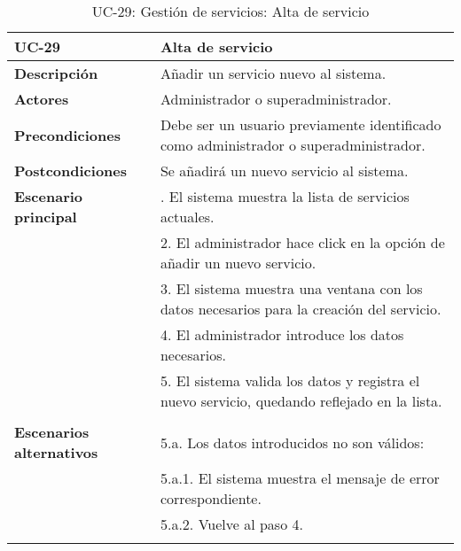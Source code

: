 \begin{table}[H]
  \begin{center}
    \begin{tabularx}{16.4cm}{|l|X|}
      \hline
      \textbf{UC-29} & \textbf{Alta de servicio}\\
      \hline
      \textbf{Descripción} & Añadir un servicio nuevo al sistema.\\
      \hline
      \textbf{Actores} & Administrador o superadministrador.\\
      \hline
      \textbf{Precondiciones} & Debe ser un usuario previamente identificado como administrador o superadministrador.\\
      \hline
      \textbf{Postcondiciones} & Se añadirá un nuevo servicio al sistema.\\
      \hline
      \textbf{Escenario principal} & \smallskip 1. El sistema muestra la lista de servicios actuales.\\
      & 2. El administrador hace click en la opción de añadir un nuevo servicio.\\
      & 3. El sistema muestra una ventana con los datos necesarios para la creación del servicio.\\
      & 4. El administrador introduce los datos necesarios.\\
      & 5. El sistema valida los datos y registra el nuevo servicio, quedando reflejado en la lista.\\
      & \\
      \hline
      \textbf{Escenarios alternativos} & \smallskip 5.a. Los datos introducidos no son válidos:\\
      & \hspace{0.3cm} 5.a.1. El sistema muestra el mensaje de error correspondiente.\\
      & \hspace{0.3cm} 5.a.2. Vuelve al paso 4.\\
      & \\
      \hline
    \end{tabularx}
    \caption{UC-29: Gestión de servicios: Alta de servicio}
  \end{center}
\end{table}


